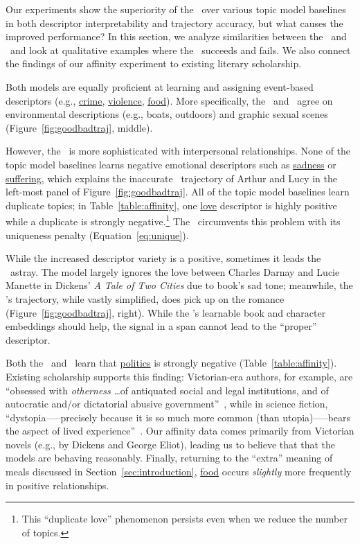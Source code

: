 Our experiments show the superiority of the \rmn\ over various topic model
baselines in both descriptor interpretability and trajectory accuracy, but what
causes the improved performance? In this section, we analyze similarities
between the \rmn\ and \htmm\ and look at qualitative examples where the
\rmn\ succeeds and fails. We also connect the findings of our affinity
experiment to existing literary scholarship.

Both models are equally proficient at learning and assigning event-based
descriptors (e.g., \underline{crime}, \underline{violence},
\underline{food}). More specifically, the \rmn\ and \htmm\ agree on
environmental descriptions (e.g., boats, outdoors) and graphic sexual scenes
(Figure~\ref{fig:goodbadtraj}, middle).

However, the \rmn\ is more sophisticated with interpersonal relationships. None
of the topic model baselines learns negative emotional descriptors such as
\underline{sadness} or \underline{suffering}, which explains the inaccurate
\htmm\ trajectory of Arthur and Lucy in the left-most panel of
Figure~\ref{fig:goodbadtraj}. All of the topic model baselines learn
duplicate topics; in Table~\ref{table:affinity}, one \underline{love} descriptor
is highly positive while a duplicate is strongly negative.\footnote{This
  ``duplicate love'' phenomenon persists even when we reduce the number of
  topics.} The \rmn\ circumvents this problem with its uniqueness penalty
(Equation~\ref{eq:unique}).

While the increased descriptor variety is a positive, sometimes it leads the
\rmn\ astray. The model largely ignores the love between Charles Darnay and
Lucie Manette in Dickens' \emph{A Tale of Two Cities} due to book's sad tone;
meanwhile, the \htmm's trajectory, while vastly simplified, does pick up on the
romance (Figure~\ref{fig:goodbadtraj}, right). While the \rmn's learnable book
and character embeddings should help, the signal in a span cannot lead to the
``proper'' descriptor.

Both the \rmn\ and \htmm\ learn that \underline{politics} is strongly negative
(Table~\ref{table:affinity}). Existing scholarship supports this finding:
Victorian-era authors, for example, are ``obsessed with \emph{otherness} \dots of
antiquated social and legal institutions, and of autocratic and/or dictatorial
abusive government''~\cite{zarifopol1995kill}, while in science fiction,
``dystopia—--precisely because it is so much more common (than utopia)—--bears
the aspect of lived experience''~\cite{gordin2010utopia}. Our affinity data
comes primarily from Victorian novels (e.g., by Dickens and George Eliot),
leading us to believe that that the models are behaving reasonably. Finally,
returning to the ``extra'' meaning of meals discussed in
Section~\ref{sec:introduction}, \underline{food} occurs
\emph{slightly} more frequently in positive relationships.
